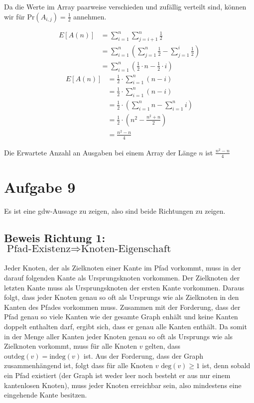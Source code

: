 \documentclass[parskip=half,a4paper]{scrartcl}
\begin{document}
Da die Werte im Array paarweise verschieden und zufällig verteilt sind, können wir für $\text{Pr}(A_{i,j}) = \frac{1}{2}$ annehmen.


\begin{equation}
\begin{aligned}
   E\left[A(n)\right] &= \sum_{i=1}^{n}{\sum_{j=i+1}^{n}{\frac{1}{2}}}\\
   &= \sum_{i=1}^{n}{\left(\sum_{j=1}^{n}{\frac{1}{2}} - \sum_{j=1}^{i}{\frac{1}{2}}\right)}\\
   &= \sum_{i=1}^{n}{\left(\frac{1}{2}\cdot n - \frac{1}{2}\cdot i\right)}
\end{aligned}
\end{equation}
\begin{equation}
\begin{aligned}
   E\left[A(n)\right] &= \frac{1}{2} \cdot \sum_{i=1}^{n}{\left(n - i\right)}\\
   &= \frac{1}{2} \cdot \sum_{i=1}^{n}{\left(n - i\right)}\\
   &= \frac{1}{2} \cdot \left(\sum_{i=1}^{n}{n} - \sum_{i=1}^{n}{i}\right)\\
   &= \frac{1}{2} \cdot \left(n^2 - \frac{n^2 + n}{2}\right)\\
   &= \frac{n^2 - n}{4}
\end{aligned}
\end{equation}

Die Erwartete Anzahl an Ausgaben bei einem Array der Länge $n$ ist $\frac{n^2 - n}{4}$

\section*{Aufgabe 9}

Es ist eine gdw-Aussage zu zeigen, also sind beide Richtungen zu zeigen.

\subsection*{Beweis Richtung 1: $\text{Pfad-Existenz} \Rightarrow \text{Knoten-Eigenschaft}$}

Jeder Knoten, der als Zielknoten einer Kante im Pfad vorkommt, muss in der darauf folgenden Kante als Ursprungsknoten vorkommen. Der Zielknoten der letzten Kante muss als Ursprungsknoten der ersten Kante vorkommen. Daraus folgt, dass jeder Knoten genau so oft als Ursprungs wie als Zielknoten in den Kanten des Pfades vorkommen muss. Zusammen mit der Forderung, dass der Pfad genau so viele Kanten wie der gesamte Graph enhält und keine Kanten doppelt enthalten darf, ergibt sich, dass er genau alle Kanten enthält. Da somit in der Menge aller Kanten jeder Knoten genau so oft als Ursprungs wie als Zielknoten vorkommt, muss für alle Knoten $v$ gelten, dass $\text{outdeg}(v) = \text{indeg}(v)$ ist. Aus der Forderung, dass der Graph zusammenhängend ist, folgt dass für alle Knoten $v$ $\text{deg}(v) \ge 1$ ist, denn sobald ein Pfad existiert (der Graph ist weder leer noch besteht er aus nur einem kantenlosen Knoten), muss jeder Knoten erreichbar sein, also mindestens eine eingehende Kante besitzen.
\end{document}
